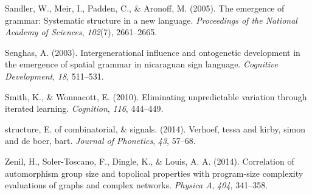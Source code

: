 \documentclass[10pt, letterpaper]{article}
\begin{document}
\leavevmode\hypertarget{ref-sandler-2005}{}%
Sandler, W., Meir, I., Padden, C., \& Aronoff, M. (2005). The emergence
of grammar: Systematic structure in a new language. \emph{Proceedings of
the National Academy of Sciences}, \emph{102}(7), 2661--2665.

\leavevmode\hypertarget{ref-senghas-2003}{}%
Senghas, A. (2003). Intergenerational influence and ontogenetic
development in the emergence of spatial grammar in nicaraguan sign
language. \emph{Cognitive Development}, \emph{18}, 511--531.

\leavevmode\hypertarget{ref-smith-2010}{}%
Smith, K., \& Wonnacott, E. (2010). Eliminating unpredictable variation
through iterated learning. \emph{Cognition}, \emph{116}, 444--449.

\leavevmode\hypertarget{ref-verhoef-2014}{}%
structure, E. of combinatorial, \& signals. (2014). Verhoef, tessa and
kirby, simon and de boer, bart. \emph{Journal of Phonetics}, \emph{43},
57--68.

\leavevmode\hypertarget{ref-zenil-2014}{}%
Zenil, H., Soler-Toscano, F., Dingle, K., \& Louis, A. A. (2014).
Correlation of automorphism group size and topolical properties with
program-size complexity evaluations of graphs and complex networks.
\emph{Physica A}, \emph{404}, 341--358.


\end{document}
